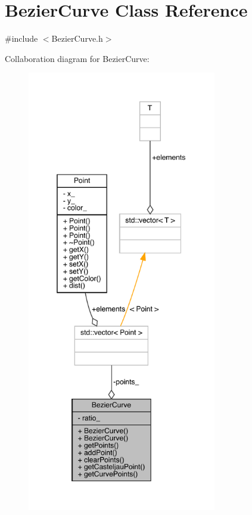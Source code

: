 \hypertarget{class_bezier_curve}{}\section{Bezier\+Curve Class Reference}
\label{class_bezier_curve}


{\ttfamily \#include $<$Bezier\+Curve.\+h$>$}



Collaboration diagram for Bezier\+Curve\+:
\nopagebreak
\begin{figure}[H]
\begin{center}
\leavevmode
\includegraphics[height=550pt]{class_bezier_curve__coll__graph}
\end{center}
\end{figure}
